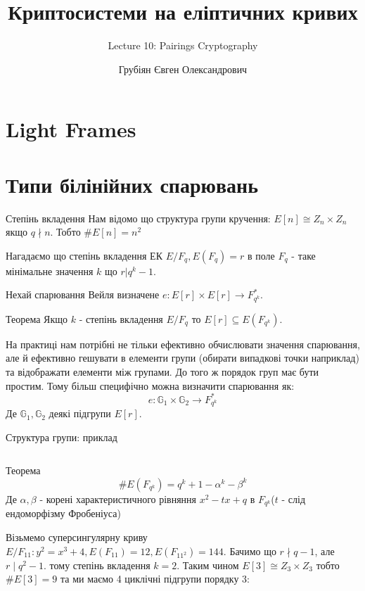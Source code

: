 \documentclass[9pt]{beamer}
\title{Криптосистеми на еліптичних кривих} %
\subtitle{Lecture 10: Pairings Cryptography}
\author{Грубіян Євген Олександрович}
\begin{document}
  \frame{\maketitle}


  \begin{darkframes}
      
    \section{Light Frames}

\section{Типи білінійних спарювань}

\begin{frame}{Степінь вкладення}
    Нам відомо що структура групи кручення: $E[n] \cong Z_n \times Z_n$ якщо $q \nmid n$. Тобто $\#E[n]=n^2$
    
    Нагадаємо що степінь вкладення ЕК $E/F_q, E(F_q)=r$ в поле $F_q$ - таке мінімальне значення $k$ що $r | q^k - 1$.

    Нехай спарювання Вейля визначене $e: E[r] \times E[r] \to F_{q^k}^*$. 
    \begin{block}{Теорема}
    Якщо $k$ - степінь вкладення $E/F_q$ то $E[r] \subseteq E(F_{q^k})$. 
    \end{block}
    На практиці нам потрібні не тільки ефективно обчислювати значення спарювання, але й ефективно гешувати в елементи групи (обирати випадкові точки наприклад) та відображати елементи між групами. До того ж порядок груп має бути простим. Тому більш специфічно можна визначити спарювання як:
    $$e: \mathbb{G}_1 \times \mathbb{G}_2 \to F_{q^k}^*$$
    Де $\mathbb{G}_1, \mathbb{G}_2$ деякі підгрупи $E[r]$.
\end{frame}

\begin{frame}{Структура групи: приклад}
\begin{columns}
        \begin{column}{0.5\textwidth}
        \begin{block}{Теорема}
            $$ \#E(F_{q^k}) = q^k +1 -\alpha^k -\beta^k $$ 
            Де $\alpha, \beta$ - корені характеристичного рівняння $x^2 -tx + q$ в $F_{q^k}$($t$ - слід ендоморфізму Фробеніуса)
        \end{block}
Візьмемо суперсингулярну криву $E/F_{11}:y^2=x^3+4, E(F_{11})=12, E(F_{11^2})=144$. Бачимо що $r \nmid q-1$, але $r \mid q^2-1$. тому степінь вкладення $k=2$. Таким чином $E[3] \cong Z_3 \times Z_3$ тобто $\#E[3]=9$ та ми маємо 4 циклічні підгрупи порядку 3:
        \end{column}


\end{columns}
\end{frame}
\end{darkframes}
\end{document}
